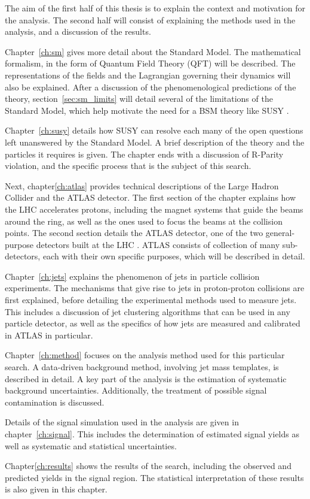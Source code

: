 The aim of the first half of this thesis is to explain the context and motivation for the analysis.
The second half will consist of explaining the methods used in the analysis, and a discussion of the results.

Chapter~\ref{ch:sm} gives more detail about the Standard Model.
The mathematical formalism, in the form of Quantum Field Theory (QFT) will be described.
The representations of the fields and the Lagrangian governing their dynamics will also be explained.
After a discussion of the phenomenological predictions of the theory, section~\ref{sec:sm_limits} will detail
several of the limitations of the Standard Model, which help motivate the need for a BSM theory like SUSY .

Chapter~\ref{ch:susy} details how SUSY can resolve each many of the open questions left unanswered by the Standard Model.
A brief description of the theory and the particles it requires is given.
The chapter ends with a discussion of R-Parity violation, and the specific process that is the subject of this search.

Next, chapter\ref{ch:atlas} provides technical descriptions of the Large Hadron Collider and the ATLAS detector.
The first section of the chapter explains how the LHC accelerates protons, including the magnet systems that guide the beams
around the ring, as well as the ones used to focus the beams at the collision points.
The second section details the ATLAS detector, one of the two general-purpose detectors built at the LHC .
ATLAS consists of collection of many sub-detectors, each with their own specific purposes, which will be described in detail.

Chapter~\ref{ch:jets} explains the phenomenon of jets in particle collision experiments.
The mechanisms that give rise to jets in proton-proton collisions are first explained,
before detailing the experimental methods used to measure jets.
This includes a discussion of jet clustering algorithms that can be used in any particle detector,
as well as the specifics of how jets are measured and calibrated in ATLAS in particular.

Chapter~\ref{ch:method} focuses on the analysis method used for this particular search.
A data-driven background method, involving jet mass templates, is described in detail.
A key part of the analysis is the estimation of systematic background uncertainties.
Additionally, the treatment of possible signal contamination is discussed.

Details of the signal simulation used in the analysis are given in chapter~\ref{ch:signal}.
This includes the determination of estimated signal yields as well as systematic and statistical uncertainties.

Chapter\ref{ch:results} shows the results of the search, including the observed and predicted yields in the signal region.
The statistical interpretation of these results is also given in this chapter.